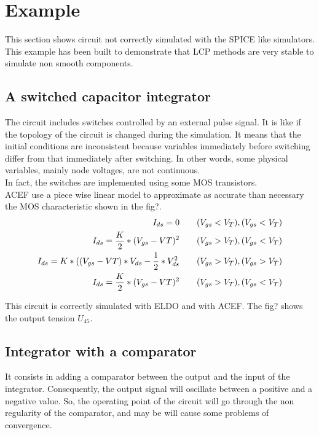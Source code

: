 \newpage
\section{Example}
This section shows circuit not correctly simulated with the SPICE like simulators. This example has
been built to demonstrate that LCP methods are very stable to simulate non smooth components.
 
\subsection{A switched capacitor integrator}


\begin{figure}[!h]
\centerline{
 \scalebox{0.7}{
    
 }
 }\end{figure}



The circuit includes switches controlled by an external pulse signal. It is like if the topology of the circuit is changed
during the simulation. It means that the initial conditions are inconsistent because variables
immediately before switching differ from that immediately after switching. In other words, some
physical variables, mainly node voltages, are not continuous.\\
In fact, the switches are implemented using some MOS transistors.\\
ACEF use a piece wise linear model to approximate as accurate than necessary the MOS characteristic
shown in the fig?.\\


\begin{eqnarray}
I_{ds}=0 \qquad (V_{gs} < V_{T}) , (V_{gs} < V_{T})\\
I_{ds}=\frac{K}{2} * (V_{gs}-V{T})^2 \qquad (V_{gs} > V_{T}) , (V_{gs} < V_{T})\\
I_{ds}=K *((V_{gs}-V{T})*V_{ds} - \frac{1}{2}*V_{ds}^2 \qquad (V_{gs} > V_{T}) , (V_{gs} > V_{T})\\
I_{ds}=\frac{K}{2} * (V_{gs}-V{T})^2 \qquad (V_{gs} > V_{T}) , (V_{gs} < V_{T})\\
\end{eqnarray}

This circuit is correctly simulated with ELDO and with ACEF. The fig? shows the output tension $U_{45}$.\\



\subsection{ Integrator with a comparator}
It consists in adding a comparator between the output and the input of the integrator. Consequently,
the output signal will oscillate between a positive and a negative value. So, the operating point of
the circuit will go through the non regularity of the comparator, and may be will cause some problems of
convergence.

